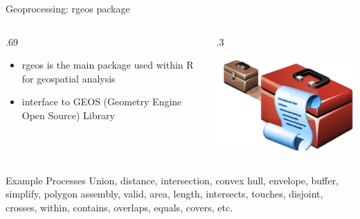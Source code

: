 \documentclass[10pt,ignorenonframetext,]{beamer}
\providecommand{\tightlist}{%
  \setlength{\itemsep}{0pt}\setlength{\parskip}{0pt}}
\def\begincols{\begin{columns}}
\def\begincol{\begin{column}}
\def\endcol{\end{column}}
\def\endcols{\end{columns}}
\begin{document}
\begin{frame}{Geoprocessing: rgeos package}

\begincols
\begincol{.69\textwidth}

\begin{itemize}
\tightlist
\item
  \alert{rgeos} is the main package used within R for geospatial
  analysis
\item
  interface to GEOS (Geometry Engine Open Source) Library
\end{itemize}

\endcol
\begincol{.3\textwidth}

\begin{center}\includegraphics[width=0.8\linewidth]{../images/toolbox} \end{center}

\endcol
\endcols

\begin{alertblock}{Example Processes}
Union, distance, intersection, convex hull, envelope, buffer, simplify, polygon assembly, valid, area, length, intersects, touches, disjoint, crosses, within, contains, overlaps, equals, covers, etc.
\end{alertblock}

\end{frame}
\end{document}
